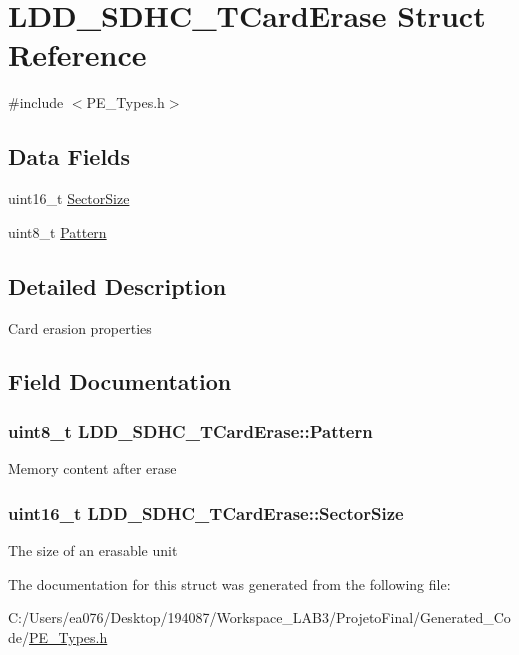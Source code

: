 \hypertarget{struct_l_d_d___s_d_h_c___t_card_erase}{\section{L\-D\-D\-\_\-\-S\-D\-H\-C\-\_\-\-T\-Card\-Erase Struct Reference}
\label{struct_l_d_d___s_d_h_c___t_card_erase}
}


{\ttfamily \#include $<$P\-E\-\_\-\-Types.\-h$>$}

\subsection*{Data Fields}
\begin{DoxyCompactItemize}
\item 
uint16\-\_\-t \hyperlink{struct_l_d_d___s_d_h_c___t_card_erase_a3c0c33e89b65f4f6bfd6043585df5486}{Sector\-Size}
\item 
uint8\-\_\-t \hyperlink{struct_l_d_d___s_d_h_c___t_card_erase_a440e717a0c559282b7e277bf0872bee3}{Pattern}
\end{DoxyCompactItemize}


\subsection{Detailed Description}
Card erasion properties 

\subsection{Field Documentation}
\hypertarget{struct_l_d_d___s_d_h_c___t_card_erase_a440e717a0c559282b7e277bf0872bee3}{
\subsubsection[{Pattern}]{\setlength{\rightskip}{0pt plus 5cm}uint8\-\_\-t L\-D\-D\-\_\-\-S\-D\-H\-C\-\_\-\-T\-Card\-Erase\-::\-Pattern}}\label{struct_l_d_d___s_d_h_c___t_card_erase_a440e717a0c559282b7e277bf0872bee3}
Memory content after erase \hypertarget{struct_l_d_d___s_d_h_c___t_card_erase_a3c0c33e89b65f4f6bfd6043585df5486}{
\subsubsection[{Sector\-Size}]{\setlength{\rightskip}{0pt plus 5cm}uint16\-\_\-t L\-D\-D\-\_\-\-S\-D\-H\-C\-\_\-\-T\-Card\-Erase\-::\-Sector\-Size}}\label{struct_l_d_d___s_d_h_c___t_card_erase_a3c0c33e89b65f4f6bfd6043585df5486}
The size of an erasable unit 

The documentation for this struct was generated from the following file\-:\begin{DoxyCompactItemize}
\item 
C\-:/\-Users/ea076/\-Desktop/194087/\-Workspace\-\_\-\-L\-A\-B3/\-Projeto\-Final/\-Generated\-\_\-\-Code/\hyperlink{_p_e___types_8h}{P\-E\-\_\-\-Types.\-h}\end{DoxyCompactItemize}
